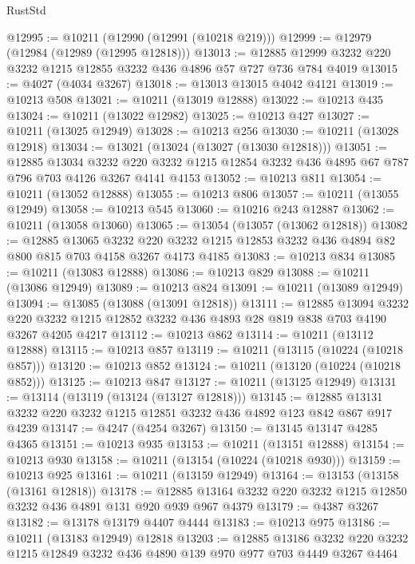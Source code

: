 \begin{lexlean}{RustStd}
\begin{coremodule}
{\begin{coremodule}
{{{{{{{{{{{{{{{{{{{{{{{{{@12995 := @10211 (@12990 (@12991 (@10218 @219)))
@12999 := @12979 (@12984 (@12989 (@12995 @12818)))
@13013 := @12885 @12999 @3232 @220 @3232 @1215 @12855 @3232 @436 @4896 @57 @727 @736 @784 @4019
@13015 := @4027 (@4034 @3267)
@13018 := @13013 @13015 @4042 @4121
@13019 := @10213 @508
@13021 := @10211 (@13019 @12888)
@13022 := @10213 @435
@13024 := @10211 (@13022 @12982)
@13025 := @10213 @427
@13027 := @10211 (@13025 @12949)
@13028 := @10213 @256
@13030 := @10211 (@13028 @12918)
@13034 := @13021 (@13024 (@13027 (@13030 @12818)))
@13051 := @12885
    @13034
    @3232
    @220
    @3232
    @1215
    @12854
    @3232
    @436
    @4895
    @67
    @787
    @796
    @703
    @4126
    @3267
    @4141
    @4153
@13052 := @10213 @811
@13054 := @10211 (@13052 @12888)
@13055 := @10213 @806
@13057 := @10211 (@13055 @12949)
@13058 := @10213 @545
@13060 := @10216 @243 @12887
@13062 := @10211 (@13058 @13060)
@13065 := @13054 (@13057 (@13062 @12818))
@13082 := @12885
    @13065
    @3232
    @220
    @3232
    @1215
    @12853
    @3232
    @436
    @4894
    @82
    @800
    @815
    @703
    @4158
    @3267
    @4173
    @4185
@13083 := @10213 @834
@13085 := @10211 (@13083 @12888)
@13086 := @10213 @829
@13088 := @10211 (@13086 @12949)
@13089 := @10213 @824
@13091 := @10211 (@13089 @12949)
@13094 := @13085 (@13088 (@13091 @12818))
@13111 := @12885
    @13094
    @3232
    @220
    @3232
    @1215
    @12852
    @3232
    @436
    @4893
    @28
    @819
    @838
    @703
    @4190
    @3267
    @4205
    @4217
@13112 := @10213 @862
@13114 := @10211 (@13112 @12888)
@13115 := @10213 @857
@13119 := @10211 (@13115 (@10224 (@10218 @857)))
@13120 := @10213 @852
@13124 := @10211 (@13120 (@10224 (@10218 @852)))
@13125 := @10213 @847
@13127 := @10211 (@13125 @12949)
@13131 := @13114 (@13119 (@13124 (@13127 @12818)))
@13145 := @12885 @13131 @3232 @220 @3232 @1215 @12851 @3232 @436 @4892 @123 @842 @867 @917 @4239
@13147 := @4247 (@4254 @3267)
@13150 := @13145 @13147 @4285 @4365
@13151 := @10213 @935
@13153 := @10211 (@13151 @12888)
@13154 := @10213 @930
@13158 := @10211 (@13154 (@10224 (@10218 @930)))
@13159 := @10213 @925
@13161 := @10211 (@13159 @12949)
@13164 := @13153 (@13158 (@13161 @12818))
@13178 := @12885 @13164 @3232 @220 @3232 @1215 @12850 @3232 @436 @4891 @131 @920 @939 @967 @4379
@13179 := @4387 @3267
@13182 := @13178 @13179 @4407 @4444
@13183 := @10213 @975
@13186 := @10211 (@13183 @12949) @12818
@13203 := @12885
    @13186
    @3232
    @220
    @3232
    @1215
    @12849
    @3232
    @436
    @4890
    @139
    @970
    @977
    @703
    @4449
    @3267
    @4464
}}}}}}}}}}}}}}}}}}}}}}}}}
\end{coremodule}}
\end{coremodule}
\end{lexlean}
